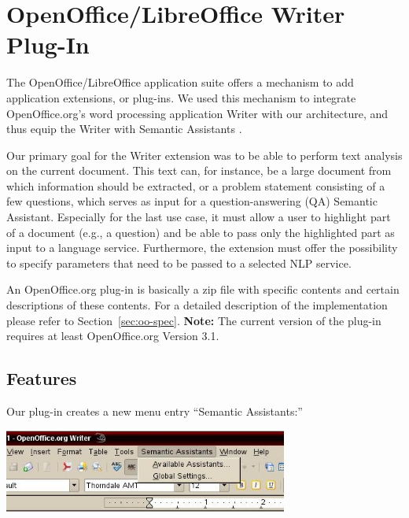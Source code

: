 %
%
%  
% 


\chapter{OpenOffice/LibreOffice Writer Plug-In}
The OpenOffice/LibreOffice application suite offers a mechanism
to add application extensions, or plug-ins. We used this
mechanism to integrate OpenOffice.org's word processing
application Writer with our architecture, and thus equip the
Writer with Semantic Assistants \citep{giwi08}.

Our primary goal for the Writer extension was to be able
to perform text analysis on the current document. This
text can, for instance, be a large document from which
information should be extracted, or a problem statement
consisting of a few questions, which serves as input for a
question-answering (QA) Semantic Assistant. Especially
for the last use case, it must allow a user to highlight part of
a document (e.g., a question) and be able to pass only the
highlighted part as input to a language service. Furthermore,
the extension must offer the possibility to specify parameters
that need to be passed to a selected NLP service.

An OpenOffice.org plug-in is basically a zip file with specific
contents and certain descriptions of these contents.  For a detailed
description of the implementation please refer to
Section~\ref{sec:oo-spec}. \textbf{Note:} The current version of the
plug-in requires at least OpenOffice.org Version 3.1.


\section{Features}
Our plug-in creates a new menu entry ``Semantic Assistants:''
\begin{center}
\includegraphics[width=0.7\textwidth]{pictures/oomenu.jpg}
\end{center}

